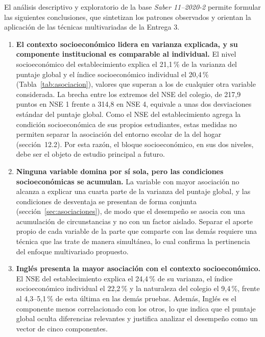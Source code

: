 \documentclass[12pt]{article}
\begin{document}
El análisis descriptivo y exploratorio de la base \textit{Saber 11--2020-2} permite
formular las siguientes conclusiones, que sintetizan los patrones observados y orientan
la aplicación de las técnicas multivariadas de la Entrega 3.

\begin{enumerate}[leftmargin=1.8em, itemsep=0.6em, topsep=0.4em]

  \item \textbf{El contexto socioeconómico lidera en varianza explicada, y
  su componente institucional es comparable al individual.} El nivel socioeconómico del
  establecimiento explica el 21{,}1\,\% de la varianza del puntaje global y el índice
  socioeconómico individual el 20{,}4\,\% (Tabla~\ref{tab:asociacion}), valores que superan
  a los de cualquier otra variable considerada. La brecha entre los extremos del NSE del
  colegio, de 217{,}9 puntos en NSE 1 frente a 314{,}8 en NSE 4, equivale a unas dos
  desviaciones estándar del puntaje global. Como el NSE del establecimiento agrega la
  condición socioeconómica de sus propios estudiantes, estas medidas no permiten separar la
  asociación del entorno escolar de la del hogar (sección~12.2). Por esta
  razón, el bloque socioeconómico, en sus dos niveles, debe ser el objeto de estudio principal a futuro.
  \item \textbf{Ninguna variable domina por sí sola, pero las condiciones socioeconómicas
  se acumulan.} La variable con mayor asociación no alcanza a explicar una cuarta parte de
  la varianza del puntaje global, y las condiciones de desventaja se presentan de forma
  conjunta (sección~\ref{sec:asociaciones}), de modo que el desempeño se
  asocia con una acumulación de circunstancias y no con un factor aislado. Separar el aporte
  propio de cada variable de la parte que comparte con las demás requiere una técnica que
  las trate de manera simultánea, lo cual confirma la pertinencia del enfoque multivariado
  propuesto.

  \item \textbf{Inglés presenta la mayor asociación con el contexto socioeconómico.}
  El NSE del establecimiento explica el 24{,}4\,\% de su varianza, el índice socioeconómico
  individual el 22{,}2\,\% y la naturaleza del colegio el 9{,}4\,\%, frente al
  4{,}3--5{,}1\,\% de esta última en las demás pruebas. Además, Inglés es el componente
  menos correlacionado con los otros, lo que indica que el puntaje global oculta diferencias
  relevantes y justifica analizar el desempeño como un vector de cinco componentes.


\end{enumerate}
\end{document}
